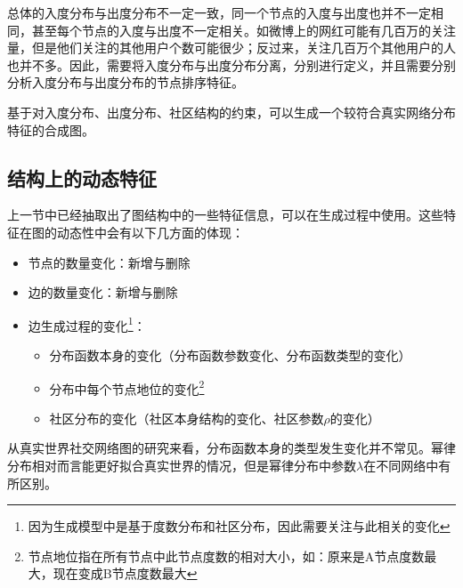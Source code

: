 总体的入度分布与出度分布不一定一致，同一个节点的入度与出度也并不一定相同，甚至每个节点的入度与出度不一定相关。如微博上的网红可能有几百万的关注量，但是他们关注的其他用户个数可能很少；反过来，关注几百万个其他用户的人也并不多。因此，需要将入度分布与出度分布分离，分别进行定义，并且需要分别分析入度分布与出度分布的节点排序特征。

基于对入度分布、出度分布、社区结构的约束，可以生成一个较符合真实网络分布特征的合成图。

\subsection{结构上的动态特征}

上一节中已经抽取出了图结构中的一些特征信息，可以在生成过程中使用。这些特征在图的动态性中会有以下几方面的体现：

\begin{itemize}
    \item 节点的数量变化：新增与删除
    \item 边的数量变化：新增与删除
    \item 边生成过程的变化\footnote{因为生成模型中是基于度数分布和社区分布，因此需要关注与此相关的变化}：
    \begin{itemize}
        \item 分布函数本身的变化（分布函数参数变化、分布函数类型的变化）
        \item 分布中每个节点地位的变化\footnote{节点地位指在所有节点中此节点度数的相对大小，如：原来是A节点度数最大，现在变成B节点度数最大}
        \item 社区分布的变化（社区本身结构的变化、社区参数$\rho$的变化）
    \end{itemize}
\end{itemize}

\vspace{0.2cm}

从真实世界社交网络图的研究来看，分布函数本身的类型发生变化并不常见。幂律分布相对而言能更好拟合真实世界的情况，但是幂律分布中参数$\lambda$在不同网络中有所区别。

